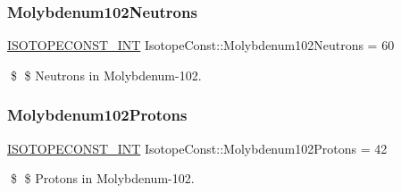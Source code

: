 \subsubsection{\texorpdfstring{Molybdenum102\+Neutrons}{Molybdenum102Neutrons}}
{\footnotesize\ttfamily \mbox{\hyperlink{group___isotope_const-_macros_ga5f18360b3e99483a35c32d789e62621c}{I\+S\+O\+T\+O\+P\+E\+C\+O\+N\+S\+T\+\_\+\+I\+NT}} Isotope\+Const\+::\+Molybdenum102\+Neutrons = 60}

\$ \$ Neutrons in Molybdenum-\/102. \mbox{\label{group___isotope_const-_molybdenum-_mo102_ga5c40fa15b9a99c92bf0ebd8883c7631c}} 
\subsubsection{\texorpdfstring{Molybdenum102\+Protons}{Molybdenum102Protons}}
{\footnotesize\ttfamily \mbox{\hyperlink{group___isotope_const-_macros_ga5f18360b3e99483a35c32d789e62621c}{I\+S\+O\+T\+O\+P\+E\+C\+O\+N\+S\+T\+\_\+\+I\+NT}} Isotope\+Const\+::\+Molybdenum102\+Protons = 42}

\$ \$ Protons in Molybdenum-\/102. 